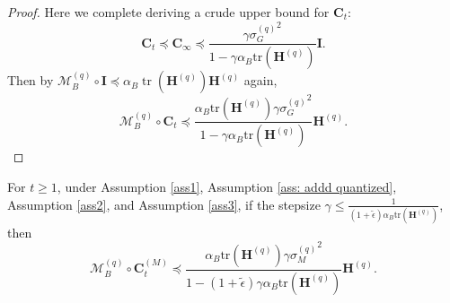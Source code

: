 \documentclass[11pt, letterpaper]{article}
\begin{document}
\begin{proof}
    Here we complete deriving a crude upper bound for $\mathbf{C}_t$:
    \begin{equation*}
        \mathbf{C}_t \preceq \mathbf{C}_\infty \preceq\frac{\gamma{\sigma_G^{(q)}}^2}{1-\gamma\alpha_B\mathrm{tr}(\mathbf{H}^{(q)})}\mathbf{I}.
    \end{equation*}
    Then by $\mathcal{M}_B^{(q)}\circ\mathbf{I}\preceq\alpha_B\operatorname{tr}(\mathbf{H}^{(q)})\mathbf{H}^{(q)}$ again,
    \begin{equation*}
        \mathcal{M}_B^{(q)} \circ \mathbf{C}_t \preceq \frac{\alpha_B\mathrm{tr}(\mathbf{H}^{(q)})\gamma{\sigma_G^{(q)}}^2}{1-\gamma\alpha_B\mathrm{tr}(\mathbf{H}^{(q)})} \mathbf{H}^{(q)}.
    \end{equation*}
\end{proof}

\begin{lemma}
    \label{A bound for M_B^{(q)} C_t^{(M)}}
    For $t \geq 1$, under Assumption \ref{ass1}, Assumption \ref{ass: addd quantized}, Assumption \ref{ass2}, and Assumption \ref{ass3}, if the stepsize $\gamma \leq \frac{1}{(1+\tilde{\epsilon})\alpha_B\mathrm{tr}(\mathbf{H}^{(q)})}$, then
    \begin{equation*}
        \mathcal{M}_B^{(q)} \circ \mathbf{C}_t^{(M)} \preceq \frac{\alpha_B\mathrm{tr}(\mathbf{H}^{(q)})\gamma{\sigma_M^{(q)}}^2}{1-(1+\tilde{\epsilon})\gamma\alpha_B\mathrm{tr}(\mathbf{H}^{(q)})} \mathbf{H}^{(q)}.
    \end{equation*}
\end{lemma}
\end{document}
